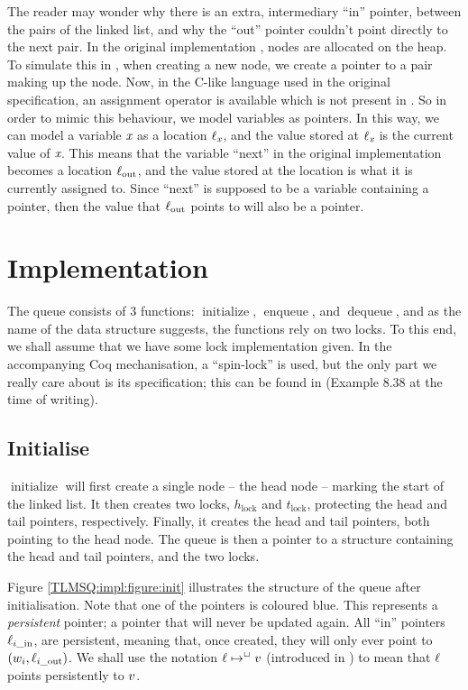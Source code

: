 \documentclass[a4paper, 10pt]{report}
\theoremstyle{definition}
\newcommand{\initialise}{\operatorname{initialize}}
\newcommand{\enqueue}{\operatorname{enqueue}}
\newcommand{\dequeue}{\operatorname{dequeue}}
\newcommand{\locinM}[1]{\loc_{#1\_\mathrm{in}}}
\newcommand{\locout}{\loc_{\mathrm{out}}}
\newcommand{\locoutM}[1]{\loc_{#1\_\mathrm{out}}}
\newcommand{\nodeval}{\valB}
\newcommand{\nodevalM}[1]{\nodeval_{#1}}
\newcommand{\Hlock}{h_{\mathrm{lock}}}
\newcommand{\Tlock}{t_{\mathrm{lock}}}
\begin{document}
The reader may wonder why there is an extra, intermediary ``in'' pointer, between the pairs of the linked list, and why the ``out'' pointer couldn't point directly to the next pair. In the original implementation \cite{DBLP:conf/podc/MichaelS96}, nodes are allocated on the heap. To simulate this in \heaplang, when creating a new node, we create a pointer to a pair making up the node. Now, in the C-like language used in the original specification, an assignment operator is available which is not present in \heaplang. So in order to mimic this behaviour, we model variables as pointers. In this way, we can model a variable $\textit{x}$ as a location $\ell_{\textit{x}}$, and the value stored at $\ell_{\textit{x}}$ is the current value of $\textit{x}$. This means that the variable ``next'' in the original implementation becomes a location $\locout$, and the value stored at the location is what it is currently assigned to. Since ``next'' is supposed to be a variable containing a pointer, then the value that $\locout$ points to will also be a pointer.


\section{Implementation}
\label{TLMSQ:section:implementation}

The queue consists of 3 functions: $\initialise$, $\enqueue$, and $\dequeue$, and as the name of the data structure suggests, the functions rely on two locks. To this end, we shall assume that we have some lock implementation given. In the accompanying Coq mechanisation, a ``spin-lock'' is used, but the only part we really care about is its specification; this can be found in \cite{gentleiris} (Example 8.38 at the time of writing).

\subsection{Initialise}

$\initialise$ will first create a single node -- the head node -- marking the start of the linked list. It then creates two locks, $\Hlock$ and $\Tlock$, protecting the head and tail pointers, respectively. Finally, it creates the head and tail pointers, both pointing to the head node. The queue is then a pointer to a structure containing the head and tail pointers, and the two locks.

Figure \ref{TLMSQ:impl:figure:init} illustrates the structure of the queue after initialisation. Note that one of the pointers is coloured blue. This represents a \emph{persistent} pointer; a pointer that will never be updated again. All ``in'' pointers $\locinM{i}$, are persistent, meaning that, once created, they will only ever point to $(\nodevalM{i}, \locoutM{i})$. We shall use the notation $\ell \mapsto^{\mathop{\Box}} v$ (introduced in \cite{DBLP:conf/cpp/VindumB21}) to mean that $\ell$ points persistently to $v$.
\end{document}
